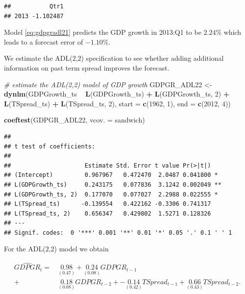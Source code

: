 \documentclass[]{book}
\newenvironment{Shaded}{\begin{snugshade}}{\end{snugshade}}
\newcommand{\KeywordTok}[1]{\textcolor[rgb]{0.13,0.29,0.53}{\textbf{#1}}}
\newcommand{\DataTypeTok}[1]{\textcolor[rgb]{0.13,0.29,0.53}{#1}}
\newcommand{\DecValTok}[1]{\textcolor[rgb]{0.00,0.00,0.81}{#1}}
\newcommand{\StringTok}[1]{\textcolor[rgb]{0.31,0.60,0.02}{#1}}
\newcommand{\CommentTok}[1]{\textcolor[rgb]{0.56,0.35,0.01}{\textit{#1}}}
\newcommand{\OperatorTok}[1]{\textcolor[rgb]{0.81,0.36,0.00}{\textbf{#1}}}
\newcommand{\NormalTok}[1]{#1}
\theoremstyle{definition}
\theoremstyle{definition}
\theoremstyle{definition}
\theoremstyle{remark}
\begin{document}
\begin{verbatim}
##           Qtr1
## 2013 -1.102487
\end{verbatim}

Model \eqref{eq:gdpgradl21} predicts the GDP growth in 2013:Q1 to be
\(2.24\%\) which leads to a forecast error of \(-1.10\%\).

We estimate the ADL(\(2\),\(2\)) specification to see whether adding
additional information on past term spread improves the forecast.

\begin{Shaded}
\begin{Highlighting}[]
\CommentTok{# estimate the ADL(2,2) model of GDP growth}
\NormalTok{GDPGR_ADL22 <-}\StringTok{ }\KeywordTok{dynlm}\NormalTok{(GDPGrowth_ts }\OperatorTok{~}\StringTok{ }\KeywordTok{L}\NormalTok{(GDPGrowth_ts) }\OperatorTok{+}\StringTok{ }\KeywordTok{L}\NormalTok{(GDPGrowth_ts, }\DecValTok{2}\NormalTok{) }
                     \OperatorTok{+}\StringTok{ }\KeywordTok{L}\NormalTok{(TSpread_ts) }\OperatorTok{+}\StringTok{ }\KeywordTok{L}\NormalTok{(TSpread_ts, }\DecValTok{2}\NormalTok{), }
                     \DataTypeTok{start =} \KeywordTok{c}\NormalTok{(}\DecValTok{1962}\NormalTok{, }\DecValTok{1}\NormalTok{), }\DataTypeTok{end =} \KeywordTok{c}\NormalTok{(}\DecValTok{2012}\NormalTok{, }\DecValTok{4}\NormalTok{))}

\KeywordTok{coeftest}\NormalTok{(GDPGR_ADL22, }\DataTypeTok{vcov. =}\NormalTok{ sandwich)}
\end{Highlighting}
\end{Shaded}

\begin{verbatim}
## 
## t test of coefficients:
## 
##                     Estimate Std. Error t value Pr(>|t|)   
## (Intercept)         0.967967   0.472470  2.0487 0.041800 * 
## L(GDPGrowth_ts)     0.243175   0.077836  3.1242 0.002049 **
## L(GDPGrowth_ts, 2)  0.177070   0.077027  2.2988 0.022555 * 
## L(TSpread_ts)      -0.139554   0.422162 -0.3306 0.741317   
## L(TSpread_ts, 2)    0.656347   0.429802  1.5271 0.128326   
## ---
## Signif. codes:  0 '***' 0.001 '**' 0.01 '*' 0.05 '.' 0.1 ' ' 1
\end{verbatim}

For the ADL(\(2\),\(2\)) model we obtain

\begin{align}
  \widehat{GDPGR}_t =& \, \underset{(0.47)}{0.98} + \underset{(0.08)}{0.24} GDPGR_{t-1} \\
                        +& \, \underset{(0.08)}{0.18} GDPGR_{t-2} + -\underset{(0.42)}{0.14} TSpread_{t-1} + \underset{(0.43)}{0.66} TSpread_{t-2}. \label{eq:gdpgradl22}
\end{align}
\end{document}
